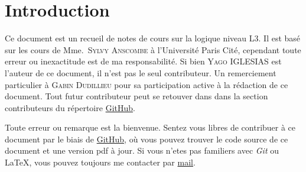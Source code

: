 \section{Introduction}

Ce document est un recueil de notes de cours sur la logique niveau L3. Il est
basé sur les cours de Mme.~\textsc{Sylvy Anscombe} à l'Université Paris Cité, cependant toute
erreur ou inexactitude est de ma responsabilité.
Si bien \textsc{Yago IGLESIAS} est l'auteur de ce document, il n'est pas
le seul contributeur. Un remerciement particulier à \textsc{Gabin Dudillieu} pour sa
participation active à la rédaction de ce document. Tout futur contributeur
peut se retouver dans dans la section contributeurs du répertoire
\href{https://github.com/Yag000/logique-notes/graphs/contributors}{GitHub}.
\vspace{0.5cm}

Toute erreur ou remarque est la bienvenue.
Sentez vous libres de contribuer à ce document par le biais de \href{https://github.com/Yag000/logique-notes}{GitHub},
où vous pouvez trouver le code source de ce document et une version pdf à jour.
Si vous n'etes pas familiers avec \textit{Git} ou \LaTeX , vous pouvez toujours me contacter
par \href{mailto: yago.iglesias.vazquez@gmail.com}{mail}.





